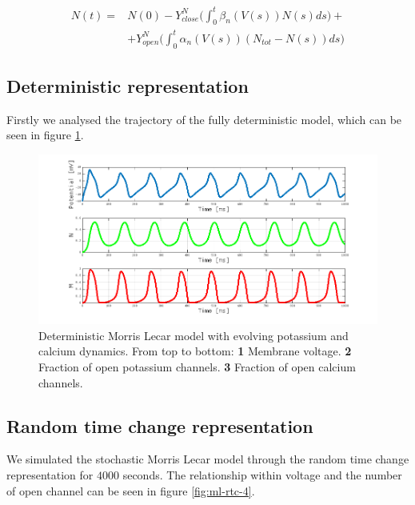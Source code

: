 \begin{align*}
	N(t) =&N(0) - Y_{close}^N\biggl(\int_0^t\beta_n(V(s))N(s)ds\biggr)+\\
				&+Y_{open}^N\biggl(\int_0^t\alpha_n(V(s))(N_{tot}-N(s))ds\biggr)
\end{align*}

	\subsection{Deterministic representation}
	Firstly we analysed the trajectory of the fully deterministic model, which can be seen in figure \ref{fig:morris-lecar-4}.

	\begin{figure}
		\includegraphics[width=\textwidth]{Figures/morris-lecar-4}
		\caption{Deterministic Morris Lecar model with evolving potassium and calcium dynamics. From top to bottom: \textbf{1} Membrane voltage. \textbf{2} Fraction of open potassium channels. \textbf{3} Fraction of open calcium channels.}
		\label{fig:morris-lecar-4}
	\end{figure}

	\subsection{Random time change representation}
	We simulated the stochastic Morris Lecar model  through the random time change representation for $4000$ seconds.
		The relationship within voltage and the number of open channel can be seen in figure \ref{fig:ml-rtc-4}.


